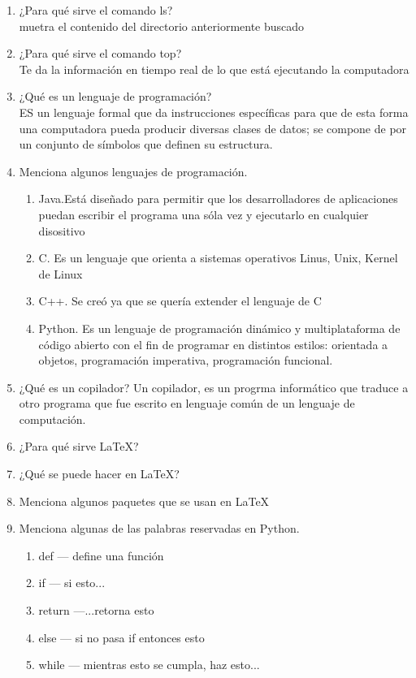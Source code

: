 \documentclass[letterpaper, 12pt, oneside]{article}%
\begin{document}
\begin{enumerate}
		\item 
		¿Para qué sirve el comando ls?\\
		muetra el contenido del directorio anteriormente buscado
		\item 
		¿Para qué sirve el comando top?\\
		Te da la información en tiempo real de lo que está ejecutando la computadora
		\item 
		¿Qué es un lenguaje de programación?\\
		ES un lenguaje formal que da instrucciones específicas para que de esta forma una computadora pueda producir diversas clases de datos; se compone de por un conjunto de símbolos que definen su estructura.
		\item 
		Menciona algunos lenguajes de programación.\\
		\begin{enumerate}
			\item 
			Java.Está diseñado para permitir que los desarrolladores de aplicaciones puedan escribir el programa una sóla vez y ejecutarlo en cualquier disositivo
			\item 
			C. Es un lenguaje que orienta a sistemas operativos Linus, Unix, Kernel de Linux
			\item
			C++. Se creó ya que se quería extender el lenguaje de C
			\item 
			Python. Es un lenguaje de programación dinámico y multiplataforma de código abierto con el fin de programar en distintos estilos: orientada a objetos, programación imperativa, programación funcional.
		\end{enumerate}		
		\item 
		¿Qué es un copilador?
		Un copilador, es un progrma informático que traduce a otro programa que fue escrito en lenguaje común de un lenguaje de computación.
		\item 
		¿Para qué sirve LaTeX?\\
		\item 
		¿Qué se puede hacer en LaTeX?\\
		\item 
		Menciona algunos paquetes que se usan en LaTeX\\
		\item 
		Menciona algunas de las palabras reservadas en Python.\\
		\begin{enumerate}
			\item 
			def --- define una función
			\item
			if --- si esto...
			\item
			return ---...retorna esto
			\item
			else --- si no pasa if entonces esto
			\item
			while --- mientras esto se cumpla, haz esto...
		\end{enumerate}
	\end{enumerate}
\end{document}
